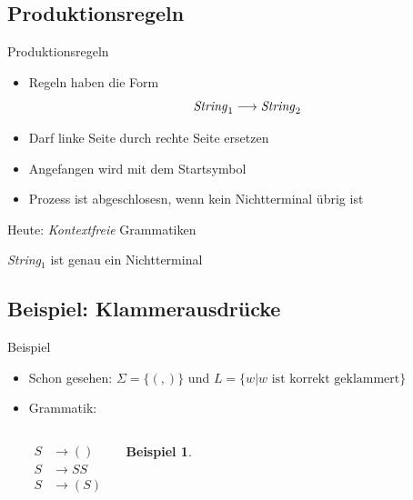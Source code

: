 \documentclass{beamer}
\theoremstyle{example}
\newtheorem{ex}{Beispiel}
\begin{document}
\subsection{Produktionsregeln}
\begin{frame}{Produktionsregeln}
  \begin{itemize}
  \item Regeln haben die Form
    \[\text{\textit{String}}_1 \longrightarrow \text{\textit{String}}_2\]
  \item Darf linke Seite durch rechte Seite ersetzen
  \item Angefangen wird mit dem Startsymbol
  \item Prozess ist abgeschlosesn, wenn kein Nichtterminal übrig ist
  \end{itemize}
\hspace{2cm} Heute: \emph{Kontextfreie} Grammatiken

\hspace{2cm} \textit{String$_1$} ist genau ein Nichtterminal

\end{frame}

\subsection{Beispiel: Klammerausdrücke}
\begin{frame}{Beispiel}
  \begin{itemize}
  \item Schon gesehen: $\Sigma = \{(,)\}$ und  $L = \{ w | \text{$w$ ist korrekt geklammert}\}$
  \item Grammatik:
    \begin{columns}[l]
     \column{2cm}
    \begin{align*}
      S &\rightarrow ()\\
      S &\rightarrow SS\\
      S &\rightarrow (S)
    \end{align*}
     \column{6cm}
     \begin{ex}
       \vspace*{5cm}
       \hspace*{6cm}
     \end{ex}
    \end{columns}
  \end{itemize}
\end{frame}
\end{document}
